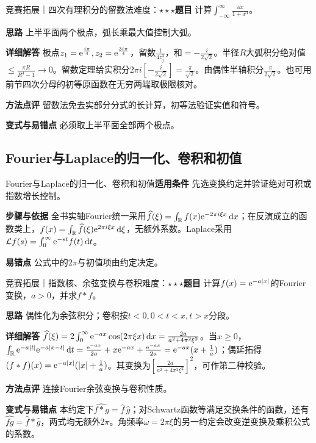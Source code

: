 \begin{example}{竞赛拓展｜四次有理积分的留数法}{难度：$\star\star\star$}\label{deep:ex:integral_complex_deep:residue4}\textbf{题目} 计算$\int_{-\infty}^{\infty}\frac{\dd x}{1+x^4}$。\par\textbf{思路} 上半平面两个极点，弧长乘最大值控制大弧。\par\textbf{详细解答} 极点$z_1=\mathrm{e}^{\frac{i\pi}{4}},z_2=\mathrm{e}^{\frac{3i\pi}{4}}$，留数$\frac{1}{4z_j^3}$，和$=-\frac{i}{2\sqrt2}$。半径$R$大弧积分绝对值$\le\frac{\pi R}{R^4-1}\to0$。留数定理给实积分$2\pi i[-\frac{i}{2\sqrt2}]=\frac{\pi}{\sqrt2}$。由偶性半轴积分$\frac{\pi}{2\sqrt2}$。也可用前节四次分母的初等原函数在无穷两端取极限核对。\par\textbf{方法点评} 留数法免去实部分分式的长计算，初等法验证实值和符号。\par\textbf{变式与易错点} 必须取上半平面全部两个极点。\end{example}

\subsection{Fourier与Laplace的归一化、卷积和初值}\label{deep:integral_complex_deep:transforms}

\begin{method}{Fourier与Laplace的归一化、卷积和初值}\textbf{适用条件} 先选变换约定并验证绝对可积或指数增长控制。\par\textbf{步骤与依据} 全书实轴Fourier统一采用$\widehat f(\xi)=\int_{\mathbb{R}} f(x)\mathrm{e}^{-2\pi i\xi x}\mathop{}\!\mathrm{d} x$；在反演成立的函数类上，$f(x)=\int_{\mathbb{R}}\widehat f(\xi)\mathrm{e}^{2\pi i\xi x}\mathop{}\!\mathrm{d}\xi$，无额外系数。Laplace采用$\mathcal Lf(s)=\int_0^\infty\mathrm{e}^{-st}f(t)\mathop{}\!\mathrm{d} t$。\par\textbf{易错点} 公式中的$2\pi$与初值项由约定决定。\end{method}

\begin{example}{竞赛拓展｜指数核、余弦变换与卷积}{难度：$\star\star\star$}\label{deep:ex:integral_complex_deep:fourierexp}\textbf{题目} 计算$f(x)=\mathrm{e}^{-a|x|}$的Fourier变换，$a>0$，并求$f*f$。\par\textbf{思路} 偶性化为余弦积分；卷积按$t<0,0<t<x,t>x$分段。\par\textbf{详细解答} $\widehat f(\xi)=2\int_0^\infty\mathrm{e}^{-ax}\cos(2\pi\xi x)\mathop{}\!\mathrm{d} x=\frac{2a}{a^2+4\pi^2\xi^2}$。当$x\ge0$，$\int_{\mathbb{R}}\mathrm{e}^{-a|t|}\mathrm{e}^{-a|x-t|}\mathop{}\!\mathrm{d} t=\frac{\mathrm{e}^{-ax}}{2a}+x\mathrm{e}^{-ax}+\frac{\mathrm{e}^{-ax}}{2a}=\mathrm{e}^{-ax}(x+\frac{1}{a})$；偶延拓得$(f*f)(x)=\mathrm{e}^{-a|x|}(|x|+\frac{1}{a})$。其变换为$[\frac{2a}{a^2+4\pi^2\xi^2}]^2$，可作第二种校验。\par\textbf{方法点评} 连接Fourier余弦变换与卷积性质。\par\textbf{变式与易错点} 本约定下$\widehat{f*g}=\widehat f\,\widehat g$；对Schwartz函数等满足交换条件的函数，还有$\widehat{fg}=\widehat f*\widehat g$，两式均无额外$2\pi$。角频率$\omega=2\pi\xi$的另一约定会改变逆变换及乘积公式的系数。\end{example}

